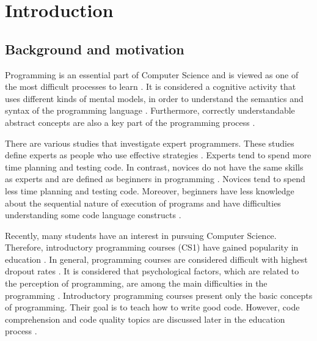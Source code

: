 %
%

\chapter{Introduction}
\label{sec:introduction}


\section{Background and motivation}

Programming is an essential part of Computer Science and is viewed as one of the most difficult processes to learn \cite{andrzejewska2020development}. It is considered a cognitive activity that uses different kinds of mental models, in order to understand the semantics and syntax of the programming language \cite{andrzejewska2020development}.
Furthermore, correctly understandable abstract concepts are also a key part of the programming process \cite{lahtinen2005study}.

There are various studies that investigate expert programmers. These studies define experts as people who use effective strategies \cite{robins2003learning}.   Experts tend to spend more time planning and testing code. In contrast, novices do not have the same skills as experts and are defined as beginners in programming \cite{robins2003learning}. Novices tend to spend less time planning and testing code. Moreover, beginners have less knowledge about the sequential nature of execution of programs and have difficulties understanding some code language constructs \cite{robins2003learning}.


Recently, many students have an interest in pursuing Computer Science. Therefore, introductory programming courses (CS1) have gained popularity in education \cite{robins2003learning}. In general, programming courses are considered difficult with highest dropout rates \cite{robins2003learning}. It is considered that psychological factors, which are related to the perception of programming, are among the main difficulties in the programming \cite{andrzejewska2020development}. Introductory programming courses present only the basic concepts of programming. Their goal is to teach how to write good code. However, code comprehension and code quality topics are discussed later in the education process \cite{ inproceedings}.

